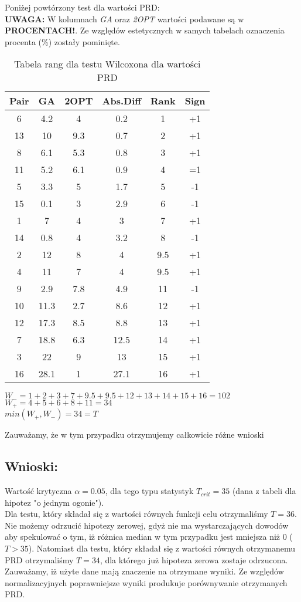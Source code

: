     Poniżej powtórzony test dla wartości PRD: \\
    \textbf{UWAGA:} W kolumnach \textit{GA} oraz \textit{2OPT} wartości podawane są w \textbf{PROCENTACH!}. Ze względów estetycznych w samych tabelach oznaczenia procenta (\%) zostały pominięte.
    \begin{table}[H]
      \centering
      \begin{tabular}{| c | c | c | c | c | c |}
        \hline
        Pair & GA & 2OPT & Abs.Diff & Rank & Sign \\
        \hline
        6 & 4.2 & 4 & 0.2 & 1 & +1 \\
        13 & 10 & 9.3 & 0.7 & 2 & +1 \\
        8 & 6.1 & 5.3 & 0.8 & 3 & +1 \\
        11 & 5.2 & 6.1 & 0.9 & 4 & =1 \\
        5 & 3.3 & 5 & 1.7 & 5 & -1 \\
        15 & 0.1 & 3 & 2.9 & 6 & -1 \\
        1 & 7 & 4 & 3 & 7 & +1 \\
        14 & 0.8 & 4 & 3.2 & 8 & -1 \\
        2 & 12 & 8 & 4 & 9.5 & +1 \\
        4 & 11 & 7 & 4 & 9.5 & +1 \\
        9 & 2.9 & 7.8 & 4.9 & 11 & -1 \\
        10 & 11.3 & 2.7 & 8.6 & 12 & +1 \\
        12 & 17.3 & 8.5 & 8.8 &13 & +1 \\
        7 & 18.8 & 6.3 & 12.5 & 14 & +1 \\
        3 & 22 & 9 & 13 & 15 & +1 \\
        16 & 28.1 & 1 & 27.1 & 16 & +1 \\
        \hline
          
      \end{tabular}
      \caption{Tabela rang dla testu Wilcoxona dla wartości PRD}
      $W_{-} = 1+2+3+7+9.5+9.5+12+13+14+15+16=102$ \\
      $W_{+} =  4+5+6+8+11=34$ \\
      $min(W_{+},W_{-}) = 34 = T$ \\
  
    \end{table}
    Zauważamy, że w tym przypadku otrzymujemy całkowicie różne wnioski
  \subsection{Wnioski: }
  Wartość krytyczna $\alpha = 0.05$, dla tego typu statystyk $T_{crit} = 35$ (dana z tabeli dla hipotez "o jednym ogonie"). \\
  Dla testu, który składał się z wartości równych funkcji celu otrzymaliśmy $T=36$.
  Nie możemy odrzucić hipotezy zerowej, gdyż nie ma wystarczających dowodów aby spekulować o tym, iż różnica median w tym przypadku jest mniejsza niż 0 ($ T > 35$).
  Natomiast dla testu, który składał się z wartości równych otrzymanemu PRD otrzymaliśmy $T=34$, dla którego już hipoteza zerowa zostaje odrzucona. \\
  Zauważamy, iż użyte dane mają znaczenie na otrzymane wyniki. Ze względów normalizacyjnych poprawniejsze wyniki produkuje porównywanie otrzymanych PRD.
    